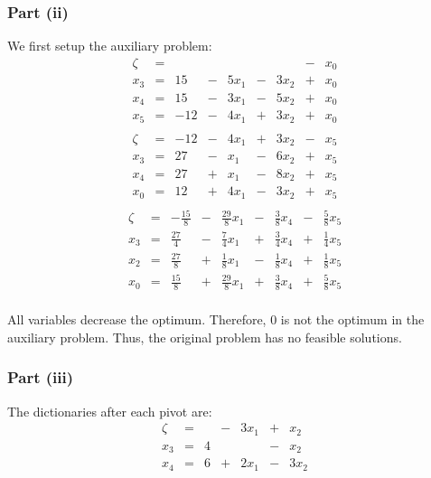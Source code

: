 \documentclass[letterpaper,12pt]{article}
\theoremstyle{definition}
\begin{document}
\subsubsection*{Part (ii)}
We first setup the auxiliary problem:
\begin{equation}
\begin{matrix}
    \zeta & = & & & & & & - & x_0 \\
    \hline
    x_3 & = & 15 & - & 5x_1 & - & 3x_2 & + & x_0 \\
    x_4 & = & 15 & - & 3x_1 & - & 5x_2 & + & x_0 \\
    x_5 & = & -12 & - & 4x_1 & + & 3x_2 & + & x_0 \\
\end{matrix}
\end{equation}
\begin{equation}
\begin{matrix}
 \zeta & = &  -12 & - & 4x_1 & + & 3x_2 & - & x_5 \\
    \hline
    x_3 & = & 27 & - & x_1 & - & 6x_2 & + & x_5 \\
    x_4 & = & 27 & + & x_1 & - & 8x_2 & + & x_5 \\
    x_0 & = & 12 & + & 4x_1 & - & 3x_2 & + & x_5 \\
\end{matrix}
\end{equation}
\begin{equation}
\begin{matrix}
\zeta & = & -\tfrac{15}{8} & - & \tfrac{29}{8}x_1 & - & \tfrac{3}{8}x_4 & - & \tfrac{5}{8}x_5 \\
    \hline
    x_3 & = & \tfrac{27}{4} & - & \tfrac{7}{4}x_1 & + & \tfrac{3}{4}x_4 & + & \tfrac{1}{4}x_5 \\
    x_2 & = & \tfrac{27}{8} & + & \tfrac{1}{8}x_1 & - & \tfrac{1}{8}x_4 & + & \tfrac{1}{8}x_5 \\
    x_0 & = & \tfrac{15}{8} & + & \tfrac{29}{8}x_1 & + & \tfrac{3}{8}x_4 & + & \tfrac{5}{8}x_5 \\
\end{matrix}
\end{equation}

All variables decrease the optimum. Therefore, 0 is not the optimum in the auxiliary problem. Thus, the original problem has no feasible solutions. 

\subsubsection*{Part (iii)}
The dictionaries after each pivot are:
\begin{equation}
\begin{matrix}
\zeta & = & & - & 3x_1 & + & x_2 \\
    \hline
    x_3 & = & 4 & & & - & x_2 \\
    x_4 & = & 6 & + & 2x_1 & - & 3x_2 \\
\end{matrix}
\end{equation}
\end{document}
